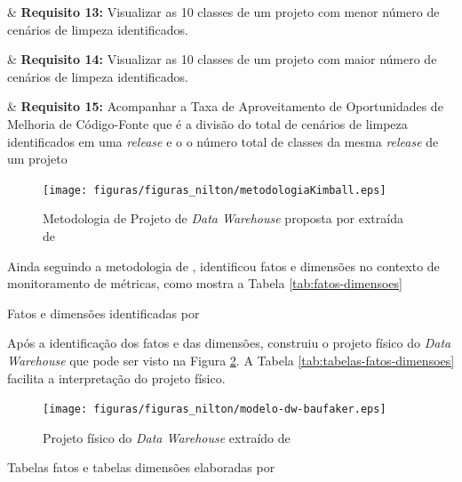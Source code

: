 \begin{easylist}[itemize]
	& \textbf{Requisito 13:} Visualizar as 10 classes de um projeto com menor número de cenários de limpeza identificados.
	
	& \textbf{Requisito 14:} Visualizar as 10 classes de um projeto com maior número de cenários de limpeza identificados.
	
	& \textbf{Requisito 15:} Acompanhar a Taxa de Aproveitamento de Oportunidades de Melhoria de Código-Fonte que é a divisão do total de cenários de limpeza identificados em uma \textit{release} e o o número total de classes da mesma \textit{release} de um projeto

	\end{easylist}

\begin{figure}[ht!]
\centering
\texttt{[image: figuras/figuras\_nilton/metodologiaKimball.eps]}
\caption{Metodologia de Projeto de \textit{Data Warehouse} proposta por  extraída de  }
\label{fig:metodologia-dw}
\end{figure}
\FloatBarrier

	
Ainda seguindo a metodologia de \cite{Kimball2002},  identificou fatos e dimensões no contexto de monitoramento de métricas, como mostra a Tabela \ref{tab:fatos-dimensoes}

\begin{table}[!ht]
	\begin{center}
	
	 
	\caption{Fatos e dimensões identificadas por }
	\label{tab:fatos-dimensoes}
	\end{center}
	\end{table}	
	\FloatBarrier


Após a identificação dos fatos e das dimensões,  construiu o projeto físico do \textit{Data Warehouse} que pode ser visto na Figura \ref{fig:arquitetura_solucao}. A Tabela \ref{tab:tabelas-fatos-dimensoes} facilita a interpretação do projeto físico.

\begin{figure}[h!]
\centering
\texttt{[image: figuras/figuras\_nilton/modelo-dw-baufaker.eps]}
\caption{Projeto físico do \textit{Data Warehouse} extraído de }
\label{fig:arquitetura_solucao}
\end{figure}
\FloatBarrier

\begin{table}[!ht]
	\begin{center}
	
	 
	\caption{Tabelas fatos e tabelas dimensões elaboradas por }
	\label{tab:tabelas-fatos-dimensoes}
	\end{center}
	\end{table}	
	\FloatBarrier
	
